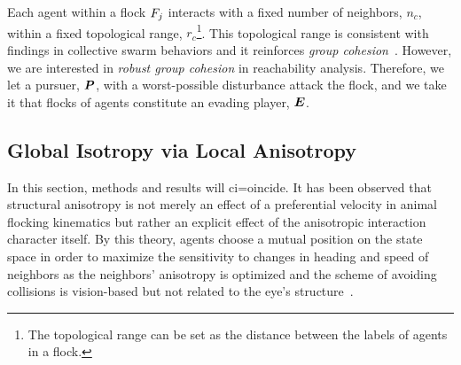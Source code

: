 Each agent within a flock $F_j$ interacts with a fixed number of neighbors, $n_c$, within a fixed topological range, $r_c$\footnote{The topological range can be set as the distance between the labels of agents in a flock.}. This topological range %
is consistent with findings in collective swarm behaviors and it reinforces \textit{group cohesion}~\cite{Ballerini1232}. However, we are interested in \textit{robust group cohesion} in reachability analysis. Therefore, we let a pursuer, $\bm{P}$, with a worst-possible disturbance attack the flock, and we take it that flocks of agents constitute an evading player, $\bm{E}$. 

\subsection{Global Isotropy via Local Anisotropy}
%
In this section, methods and results will ci=oincide. It has been observed that structural anisotropy is not merely an effect of a preferential velocity in animal flocking kinematics but rather an explicit effect of the anisotropic interaction character itself. By this theory, agents choose a mutual position on the state space in order to maximize the sensitivity to changes in heading and speed of neighbors as the neighbors' anisotropy is optimized and the scheme of avoiding collisions  is vision-based but not related to the eye's structure~\cite{Ballerini1232}.
 
